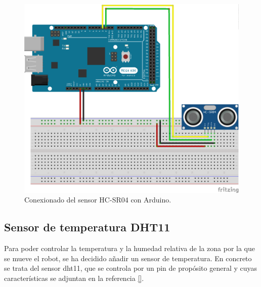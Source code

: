 \begin{figure}[H]
  \begin{center}
    \includegraphics[scale=0.6]{imagenes/conexionado_ultrasonido.png}
  \end{center}
  \caption{Conexionado del sensor HC-SR04 con Arduino.}
  \label{figura:sensor_HC-SR04_conexionado}
\end{figure}


\subsection{Sensor de temperatura DHT11}
\label{sec:dth11}


Para poder controlar la temperatura y la humedad relativa de la zona por la que se mueve el
robot, se ha decidido añadir un sensor de temperatura. En concreto se trata del sensor dht11, que
se controla por un pin de propósito general y cuyas características se adjuntan en la referencia \ref{}.

